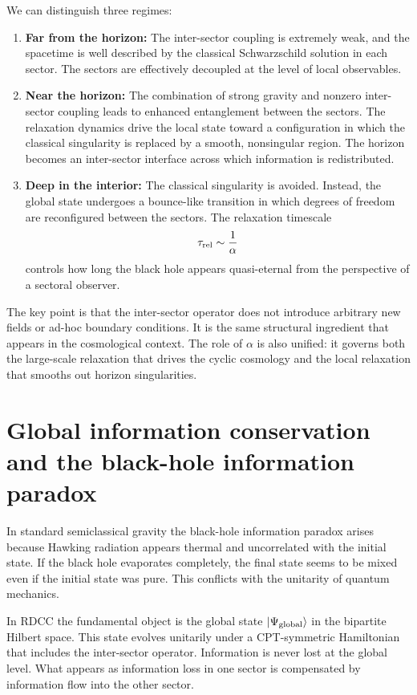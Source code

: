 \documentclass[11pt,a4paper]{article}
\begin{document}
We can distinguish three regimes:
\begin{enumerate}
    \item \textbf{Far from the horizon:} The inter-sector coupling is extremely weak, and the spacetime is well described by the classical Schwarzschild solution in each sector. The sectors are effectively decoupled at the level of local observables.
    \item \textbf{Near the horizon:} The combination of strong gravity and nonzero inter-sector coupling leads to enhanced entanglement between the sectors. The relaxation dynamics drive the local state toward a configuration in which the classical singularity is replaced by a smooth, nonsingular region. The horizon becomes an inter-sector interface across which information is redistributed.
    \item \textbf{Deep in the interior:} The classical singularity is avoided. Instead, the global state undergoes a bounce-like transition in which degrees of freedom are reconfigured between the sectors. The relaxation timescale
    \begin{equation}
    \tau_{\rm rel} \sim \frac{1}{\alpha}
    \end{equation}
    controls how long the black hole appears quasi-eternal from the perspective of a sectoral observer.
\end{enumerate}

The key point is that the inter-sector operator does not introduce arbitrary new fields or ad-hoc boundary conditions. It is the same structural ingredient that appears in the cosmological context. The role of \(\alpha\) is also unified: it governs both the large-scale relaxation that drives the cyclic cosmology and the local relaxation that smooths out horizon singularities.

\section{Global information conservation and the black-hole information paradox}

In standard semiclassical gravity the black-hole information paradox arises because Hawking radiation appears thermal and uncorrelated with the initial state. If the black hole evaporates completely, the final state seems to be mixed even if the initial state was pure. This conflicts with the unitarity of quantum mechanics.

In RDCC the fundamental object is the global state \(\ket{\Psi_{\rm global}}\) in the bipartite Hilbert space. This state evolves unitarily under a CPT-symmetric Hamiltonian that includes the inter-sector operator. Information is never lost at the global level. What appears as information loss in one sector is compensated by information flow into the other sector.
\end{document}
